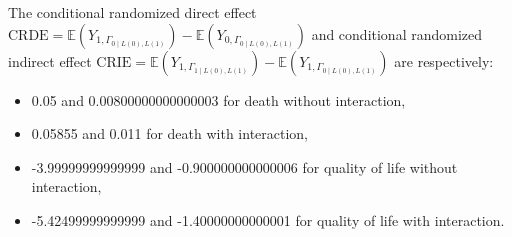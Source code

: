\documentclass[
]{book}
\providecommand{\tightlist}{%
  \setlength{\itemsep}{0pt}\setlength{\parskip}{0pt}}
\begin{document}
The conditional randomized direct effect \(\text{CRDE}=\mathbb{E}\left(Y_{1,\Gamma_{0\mid L(0),L(1)}}\right) - \mathbb{E}\left(Y_{0,\Gamma_{0\mid L(0),L(1)}}\right)\) and conditional randomized indirect effect \(\text{CRIE}=\mathbb{E}\left(Y_{1,\Gamma_{1\mid L(0),L(1)}}\right) - \mathbb{E}\left(Y_{1,\Gamma_{0\mid L(0),L(1)}}\right)\) are respectively:

\begin{itemize}
\tightlist
\item
  0.05 and 0.00800000000000003 for death without interaction,
\item
  0.05855 and 0.011 for death with interaction,
\item
  -3.99999999999999 and -0.900000000000006 for quality of life without interaction,
\item
  -5.42499999999999 and -1.40000000000001 for quality of life with interaction.
\end{itemize}
\end{document}

